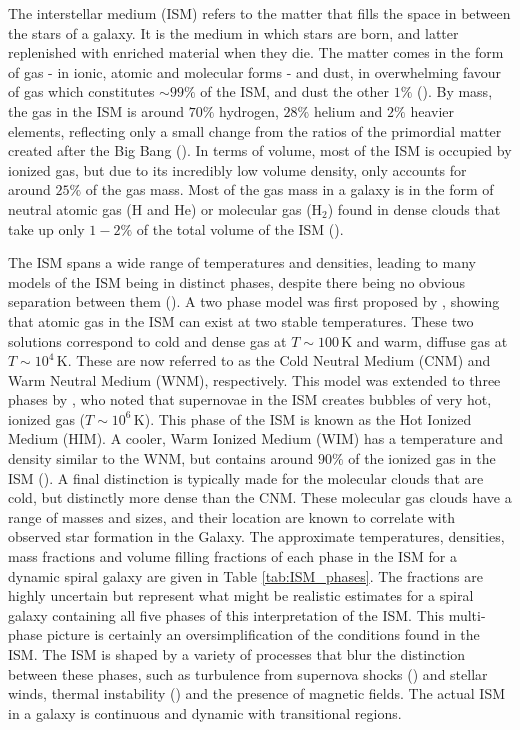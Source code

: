 The interstellar medium (ISM) refers to the matter that fills the space in between the stars of a galaxy. It is the medium in which stars are born, and latter replenished with enriched material when they die. The matter comes in the form of gas - in ionic, atomic and molecular forms - and dust, in overwhelming favour of gas which constitutes $\sim99\%$ of the ISM, and dust the other $1\%$ (\citealt{Ferriere_2001}). By mass, the gas in the ISM is around $70\%$ hydrogen, $28\%$ helium and $2\%$ heavier elements, reflecting only a small change from the ratios of the primordial matter created after the Big Bang (\citealt{Klessen_2016}). In terms of volume, most of the ISM is occupied by ionized gas, but due to its incredibly low volume density, only accounts for around $25\%$ of the gas mass. Most of the gas mass in a galaxy is in the form of neutral atomic gas (H and He) or molecular gas (H$_2$) found in dense clouds that take up only $1 - 2\%$ of the total volume of the ISM (\citealt{Dyson_1997, Klessen_2016}).

The ISM spans a wide range of temperatures and densities, leading to many models of the ISM being in distinct phases, despite there being no obvious separation between them (\citealt{Cox_2005}). A two phase model was first proposed by \citealt{Field_1969}, showing that atomic gas in the ISM can exist at two stable temperatures. These two solutions correspond to cold and dense gas at $T\sim100\,$K and warm, diffuse gas at $T\sim10^4\,$K. These are now referred to as the Cold Neutral Medium (CNM) and Warm Neutral Medium (WNM), respectively. This model was extended to three phases by \citealt{McKee_1977}, who noted that supernovae in the ISM creates bubbles of very hot, ionized gas ($T\sim10^6\,$K). This phase of the ISM is known as the Hot Ionized Medium (HIM). A cooler, Warm Ionized Medium (WIM) has a temperature and density similar to the WNM, but contains around $90\%$ of the ionized gas in the ISM (\citealt{Haffner_2009}). A final distinction is typically made for the molecular clouds that are cold, but distinctly more dense than the CNM. These molecular gas clouds have a range of masses and sizes, and their location are known to correlate with observed star formation in the Galaxy. The approximate temperatures, densities, mass fractions and volume filling fractions of each phase in the ISM for a dynamic spiral galaxy are given in Table \ref{tab:ISM_phases}. The fractions are highly uncertain but represent what might be realistic estimates for a spiral galaxy containing all five phases of this interpretation of the ISM. This multi-phase picture is certainly an oversimplification of the conditions found in the ISM. The ISM is shaped by a variety of processes that blur the distinction between these phases, such as turbulence from supernova shocks (\citealt{MacLow_2004}) and stellar winds, thermal instability (\citealt{Kritsuk_2002}) and the presence of magnetic fields. The actual ISM in a galaxy is continuous and dynamic with transitional regions.

